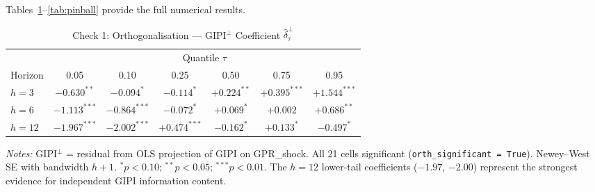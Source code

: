 \documentclass[12pt]{article}
\begin{document}
Tables~\ref{tab:orth}--\ref{tab:pinball} provide the full numerical results.

\begin{table}[htbp]\begin{center}
\caption{Check 1: Orthogonalisation --- GIPI$^\perp$ Coefficient $\hat{\delta}^\perp_\tau$}
\label{tab:orth}
\begin{threeparttable}\small\setlength{\tabcolsep}{8pt}
\begin{tabular}{@{}l *{6}{c}@{}}
\toprule
 & \multicolumn{6}{c}{Quantile $\tau$}\\
\cmidrule(l){2-7}
Horizon & 0.05 & 0.10 & 0.25 & 0.50 & 0.75 & 0.95\\
\midrule
$h=3$  & $-0.630^{**}$ & $-0.094^{*}$   & $-0.114^{*}$   & $+0.224^{**}$ & $+0.395^{***}$ & $+1.544^{***}$\\[2pt]
$h=6$  & $-1.113^{***}$ & $-0.864^{***}$ & $-0.072^{*}$  & $+0.069^{*}$  & $+0.002$       & $+0.686^{**}$\\[2pt]
$h=12$ & $-1.967^{***}$ & $-2.002^{***}$ & $+0.474^{***}$ & $-0.162^{*}$ & $+0.133^{*}$   & $-0.497^{*}$\\
\bottomrule
\end{tabular}
\begin{tablenotes}[flushleft]\footnotesize
\item \textit{Notes:} GIPI$^\perp$ = residual from OLS projection of GIPI on GPR\_shock.
All 21 cells significant (\texttt{orth\_significant = True}).
Newey--West SE with bandwidth $h{+}1$.
$^{*}p<0.10$;\; $^{**}p<0.05$;\; $^{***}p<0.01$.
The $h{=}12$ lower-tail coefficients ($-1.97$, $-2.00$) represent the
strongest evidence for independent GIPI information content.
\end{tablenotes}
\end{threeparttable}
\end{center}\end{table}
\end{document}

